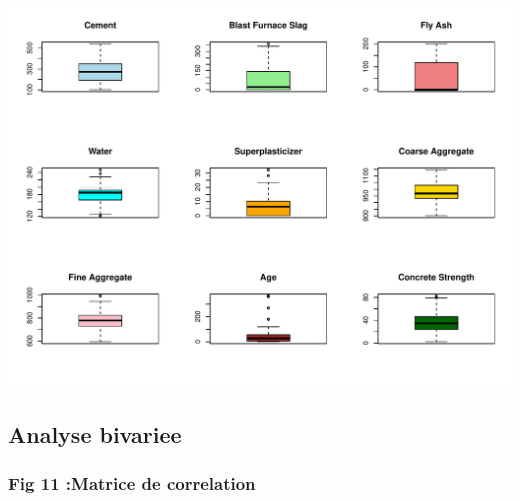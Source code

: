 \documentclass[
  12pt,
]{article}
\begin{document}
\includegraphics{rmd_final_files/figure-latex/boxplots_outliers-1.pdf}

\subsection{Analyse bivariee}\label{analyse-bivariee}

\subsubsection{Fig 11 :Matrice de
correlation}\label{fig-11-matrice-de-correlation}
\end{document}

